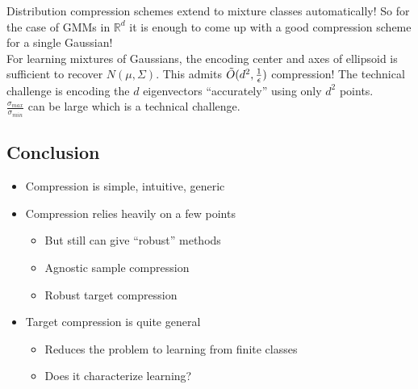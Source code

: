 \documentclass{article}
\begin{document}
\noindent Distribution compression schemes extend to mixture classes automatically! So for the case of GMMs in $\mathbb{R}^d$ it is enough to come up with a good compression scheme for a single Gaussian!\\

\noindent For learning mixtures of Gaussians, the encoding center and axes of ellipsoid is sufficient to recover $N(\mu,\Sigma)$. This admits $\Tilde{O}(d^2,\frac{1}{\epsilon})$ compression! The technical challenge is encoding the $d$ eigenvectors “accurately” using only $d^2$ points.\\

\noindent $\frac{\sigma_{max}}{\sigma_{min}}$ can be large which is a technical challenge.

\subsection{Conclusion}

\begin{itemize}
    \item Compression is simple, intuitive, generic
    \item Compression relies heavily on a few points
    \begin{itemize}
        \item But still can give “robust” methods
        \item Agnostic sample compression
        \item Robust target compression
    \end{itemize}
    \item Target compression is quite general
    \begin{itemize}
        \item Reduces the problem to learning from finite classes
        \item Does it characterize learning?
    \end{itemize}
\end{itemize}

\newpage

\end{document}
